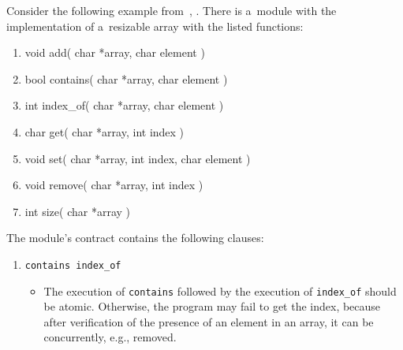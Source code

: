 \begin{example}
    Consider the following example from~\cite{contracts2017},
    \cite{contracts2015}. There is a~module with the implementation of
    a~resizable array with the listed functions:
    \begin{enumerate}[label={$ f_{\arabic*} $:}]
        \tt

        \item
            \textcolor{bluekeywords}{void} add(%
                \textcolor{bluekeywords}{char} *array,
                \textcolor{bluekeywords}{char} element%
            )

        \item
            \textcolor{bluekeywords}{bool} contains(%
                \textcolor{bluekeywords}{char} *array,
                \textcolor{bluekeywords}{char} element%
            )

        \item
            \textcolor{bluekeywords}{int} index\_of(%
                \textcolor{bluekeywords}{char} *array,
                \textcolor{bluekeywords}{char} element%
            )

        \item
            \textcolor{bluekeywords}{char} get(%
                \textcolor{bluekeywords}{char} *array,
                \textcolor{bluekeywords}{int} index%
            )

        \item
            \textcolor{bluekeywords}{void} set(%
                \textcolor{bluekeywords}{char} *array,
                \textcolor{bluekeywords}{int} index,
                \textcolor{bluekeywords}{char} element%
            )

        \item
            \textcolor{bluekeywords}{void} remove(%
                \textcolor{bluekeywords}{char} *array,
                \textcolor{bluekeywords}{int} index%
            )

        \item
            \textcolor{bluekeywords}{int} size(%
                \textcolor{bluekeywords}{char} *array%
            )
    \end{enumerate}
    The module's contract contains the following clauses:
    \begin{enumerate}[label={$ (\varrho_{\arabic*}) $}]
        \item
            \texttt{contains index\_of}
            \begin{itemize}[label=]
                \item
                    The execution of \texttt{contains} followed by the execution
                    of \texttt{index\_of} should be atomic. Otherwise,
                    the program may fail to get the index, because after
                    verification of the presence of an element in an array, it
                    can be concurrently, e.g., removed.
            \end{itemize}


\end{enumerate}
\end{example}
